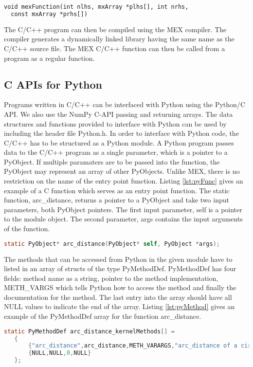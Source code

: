\begin{lstlisting}[float,language=lisp, label={lst:mexFunc}, caption={Function signature of mexFunction}]
void mexFunction(int nlhs, mxArray *plhs[], int nrhs, 
  const mxArray *prhs[])
\end{lstlisting}

The C/C++ program can then be compiled using the MEX compiler. The compiler generates a dynamically linked library having the same name as the C/C++ source file. The MEX C/C++ function can then be called from a \matlab program as a regular \matlab function. 

\subsection{C APIs for Python}
Programs written in C/C++ can be interfaced with Python using the Python/C\cite{pyc} API. We also use the NumPy C-API\cite{numpyc} passing and returning arrays. The data structures and functions provided to interface with Python can be used by including the header file \textsf{Python.h}. In order to interface with Python code, the C/C++ has to be structured as a Python module. 
A Python program passes data to the C/C++ program as a single parameter, which is a pointer to a PyObject. If multiple paramaters are to be passed into the function, the PyObject may represent an array of other PyObjects. Unlike MEX, there is no restriction on the name of the entry point function. Listing \ref{lst:pyFunc} gives an example of a C function which serves as an entry point function. The static function, arc\_distance, returns a pointer to a PyObject and take two input parameters, both PyObject pointers. The first input parameter, \textsf{self} is a pointer to the module object. The second parameter, \textsf{args} contains the input arguments of the function. 
\begin{lstlisting}[float,language=C, label={lst:pyFunc}, caption={Signature of a function that can be called from Python}]
  static PyObject* arc_distance(PyObject* self, PyObject *args); 
\end{lstlisting}

The methods that can be accessed from Python in the given module have to listed in an array of structs of the type PyMethodDef. PyMethodDef has four fields: method name as a string, pointer to the method implementation, METH\_VARGS which tells Python how to access the method and finally the documentation for the method. The last entry into the array should have all NULL values to indicate the end of the array. Listing \ref{lst:pyMethod} gives an example of the PyMethodDef array for the function arc\_distance. 
\begin{lstlisting}[language=C, label={lst:pyMethod}, caption={An Example of the PyMethodDef struct }]
static PyMethodDef arc_distance_kernelMethods[] =
   {
       {"arc_distance",arc_distance,METH_VARARGS,"arc_distance of a circle. "},
       {NULL,NULL,0,NULL}
   };
\end{lstlisting}

